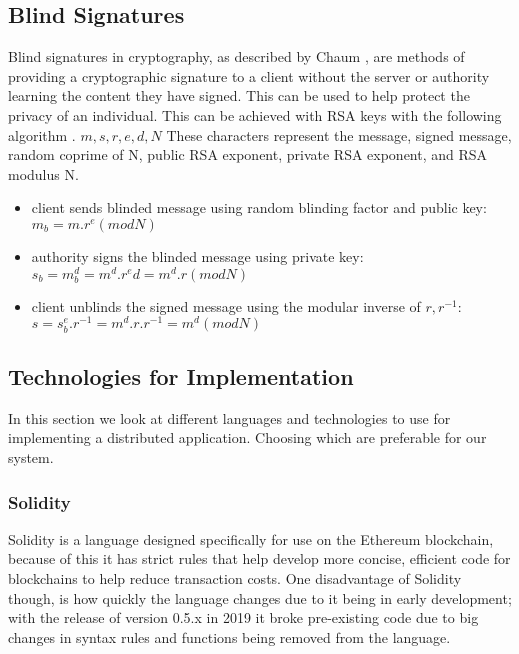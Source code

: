 \documentclass{entcs}
\begin{document}

\subsection{Blind Signatures}
Blind signatures in cryptography, as described by Chaum \cite{chaum1983blind}, are methods of providing a cryptographic signature to a client without the server or authority learning the content they have signed. This can be used to help protect the privacy of an individual. This can be achieved with RSA keys with the following algorithm \cite{MITcrypto}.
\(m, s, r, e, d, N\) These characters represent the message, signed message, random coprime of N, public RSA exponent, private RSA exponent, and RSA modulus N.
\begin{itemize}
    \item client sends blinded message using random blinding factor and public key: \\
    \(m_b = m.r^e (mod N)\)
    \item authority signs the blinded message using private key: \\
    \(s_b = m^d_b = m^d.r^ed = m^d.r (mod N)\)
    \item client unblinds the signed message using the modular inverse of \(r, r^{-1}\): \\
    \(s = s^e_b.r^{-1} = m^d.r.r^{-1} = m^d (mod N)\)
\end{itemize}

\subsection{Technologies for Implementation}
In this section we look at different languages and technologies to use for implementing a distributed application. Choosing which are preferable for our system.


\subsubsection{Solidity}
Solidity is a language designed specifically for use on the Ethereum blockchain, because of this it has strict rules that help develop more concise, efficient code for blockchains to help reduce transaction costs. One disadvantage of Solidity though, is how quickly the language changes due to it being in early development; with the release of version 0.5.x in 2019 it broke pre-existing code due to big changes in syntax rules and functions being removed from the language.
\end{document}
